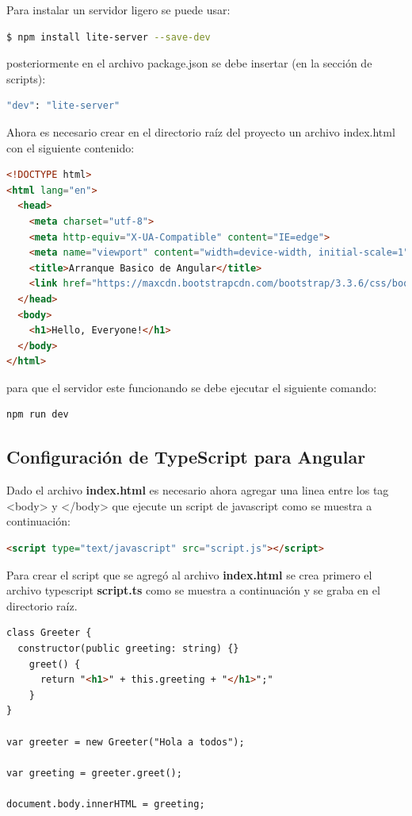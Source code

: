 \documentclass[12pt,twoside]{book}
\begin{document}
Para instalar un servidor ligero se puede usar:

\begin{lstlisting}[language=bash] 
$ npm install lite-server --save-dev
\end{lstlisting}

posteriormente en el archivo package.json se debe insertar (en la sección de scripts):

\begin{lstlisting}[language=bash] 
"dev": "lite-server"
\end{lstlisting}

Ahora es necesario crear en el directorio raíz del proyecto un archivo index.html con el siguiente contenido:


\begin{lstlisting}[language=html] 
<!DOCTYPE html>
<html lang="en">
  <head>
    <meta charset="utf-8">
    <meta http-equiv="X-UA-Compatible" content="IE=edge">
    <meta name="viewport" content="width=device-width, initial-scale=1">
    <title>Arranque Basico de Angular</title>
    <link href="https://maxcdn.bootstrapcdn.com/bootstrap/3.3.6/css/bootstrap.min.css" rel="stylesheet">
  </head>
  <body>
    <h1>Hello, Everyone!</h1>
  </body>
</html>
\end{lstlisting}


para que el servidor este funcionando se debe ejecutar el siguiente comando:

\begin{lstlisting}[language=bash] 
npm run dev
\end{lstlisting}


\subsection{Configuración de TypeScript para Angular}

Dado el archivo \textbf{index.html} es necesario ahora agregar una linea entre los tag <body> y </body> que ejecute un script de javascript como se muestra a continuación:

\begin{lstlisting}[language=html]
<script type="text/javascript" src="script.js"></script>
\end{lstlisting}

Para crear el script que se agregó al archivo \textbf{index.html} se crea primero el archivo typescript \textbf{script.ts} como se muestra a continuación y se graba en el directorio raíz.

\begin{lstlisting}[language=html]
class Greeter {
  constructor(public greeting: string) {}
    greet() {
      return "<h1>" + this.greeting + "</h1>";"
    }
}

var greeter = new Greeter("Hola a todos");

var greeting = greeter.greet();

document.body.innerHTML = greeting;
\end{lstlisting}
\end{document}
